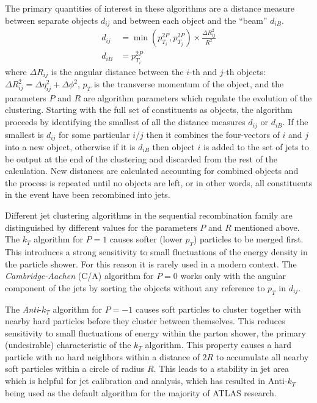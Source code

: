 The primary quantities of interest in these algorithms are a distance measure between separate objects $d_{ij}$ and between each object and the ``beam'' $d_{iB}$.
\begin{align}
d_{ij} &= \min\left({p_{T_i}^{2P}, p_{T_j}^{2P}}\right) \times \frac{\Delta R_{ij}^2}{R^2} \\
d_{iB} &= p_{T_i}^{2P}
\end{align}
where $\Delta R_{ij}$ is the angular distance between the $i$-th and $j$-th objects: $\Delta R_{ij}^2 = \Delta \eta_{ij}^2 + \Delta \phi^2$, $p_T$ is the transverse momentum of the object, and the parameters $P$ and $R$ are algorithm parameters which regulate the evolution of the clustering.
Starting with the full set of constituents as objects, the algorithm proceeds by identifying the smallest of all the distance measures $d_{ij}$ or $d_{iB}$.
If the smallest is $d_{ij}$ for some particular $i$/$j$ then it combines the four-vectors of $i$ and $j$ into a new object, otherwise if it is $d_{iB}$ then object $i$ is added to the set of jets to be output at the end of the clustering and discarded from the rest of the calculation.
New distances are calculated accounting for combined objects and the process is repeated until no objects are left, or in other words, all constituents in the event have been recombined into jets.

Different jet clustering algorithms in the sequential recombination family are distinguished by different values for the parameters $P$ and $R$ mentioned above. 
The $k_T$ algorithm \cite{Catani:1993hr} for $P=1$ causes softer (lower $p_T$) particles to be merged first.
This introduces a strong sensitivity to small fluctuations of the energy density in the particle shower.
For this reason it is rarely used in a modern context.
The \textit{Cambridge-Aachen} (C/A) algorithm \cite{Dokshitzer:1997in} for $P=0$ works only with the angular component of the jets by sorting the objects without any reference to $p_T$ in $d_{ij}$.

The \textit{Anti}-$k_T$ algorithm \cite{Cacciari:2008gp} for $P = -1$ causes soft particles to cluster together with nearby hard particles before they cluster between themselves. 
This reduces sensitivity to small fluctuations of energy within the parton shower, the primary (undesirable) characteristic of the $k_T$ algorithm.
This property causes a hard particle with no hard neighbors within a distance of $2R$ to accumulate all nearby soft particles within a circle of radius $R$.
This leads to a stability in jet area which is helpful for jet calibration and analysis, which has resulted in Anti-$k_T$ being used as the default algorithm for the majority of ATLAS research.

